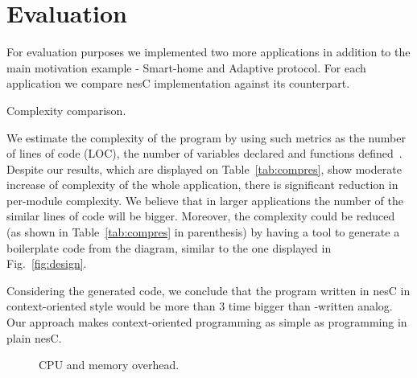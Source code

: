 \section{Evaluation}\label{sec:eval}

For evaluation purposes we implemented two more applications in addition to the
main motivation example - Smart-home and Adaptive protocol. For each application
we compare nesC implementation against its \conesc counterpart.

\begin{table}[!h]
\renewcommand{\arraystretch}{1.3}
\caption{Complexity comparison.}
\label{tab:compres}
\resizebox{\columnwidth}{!}{
  
}
\end{table}

We estimate the complexity of the program by using such metrics as the number of
lines of code (LOC), the number of variables declared and functions
defined~\cite{Pressman01}. Despite our results, which are displayed on
Table~\ref{tab:compres}, show moderate increase of complexity of the whole
application, there is significant reduction in per-module complexity. We believe
that in larger applications the number of the similar lines of code will be
bigger. Moreover, the complexity could be reduced (as shown in
Table~\ref{tab:compres} in parenthesis) by having a tool to generate a
boilerplate code from the diagram, similar to the one displayed in
Fig.~\ref{fig:design}.

Considering the generated code, we conclude that the program written in nesC in
context-oriented style would be more than 3 time bigger than \conesc-written
analog. Our approach makes context-oriented programming as simple as programming
in plain nesC.

\begin{figure}
\centering
{}
\caption{CPU and memory overhead.}
\label{fig:cmo}
\end{figure}

